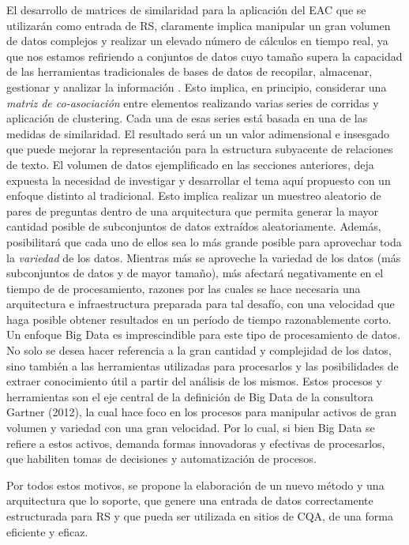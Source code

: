 \bigskip El desarrollo de matrices de similaridad para la aplicación del EAC que se utilizarán como entrada de RS, claramente implica manipular un gran volumen de datos complejos y realizar un elevado número de cálculos en tiempo real, ya que nos estamos refiriendo a conjuntos de datos cuyo tamaño supera la capacidad de las herramientas tradicionales de bases de datos de recopilar, almacenar, gestionar y analizar la información \citep{de2016mineria}. Esto implica, en principio, considerar una \textit{matriz de co-asociación} entre elementos realizando varias series de corridas y aplicación de clustering. Cada una de esas series está basada en una de las medidas de similaridad. El resultado será un un valor adimensional e insesgado que puede mejorar la representación para la estructura subyacente de relaciones de texto. El volumen de datos ejemplificado en las secciones anteriores, deja expuesta la necesidad de investigar y desarrollar el tema aquí propuesto con un enfoque distinto al tradicional. Esto implica realizar un muestreo aleatorio de pares de preguntas dentro de una arquitectura que permita generar la mayor cantidad posible de subconjuntos de datos extraídos aleatoriamente. Además, posibilitará que cada uno de ellos sea lo más grande posible para aprovechar toda la \textit{variedad} de los datos. Mientras más se aproveche la variedad de los datos (más subconjuntos de datos y de mayor tamaño), más afectará negativamente en el tiempo de de procesamiento, razones por las cuales se hace necesaria una arquitectura e infraestructura preparada para tal desafío, con una velocidad que haga posible obtener resultados en un período de tiempo razonablemente corto. Un enfoque Big Data es imprescindible  para este tipo de procesamiento de datos. No solo se desea hacer referencia a la gran cantidad y complejidad de los datos, sino también a las herramientas utilizadas para procesarlos y las posibilidades de extraer conocimiento útil a partir del análisis de los mismos. Estos procesos y herramientas son el eje central de la definición de Big Data de la consultora Gartner (2012), la cual hace foco en los procesos para manipular activos de gran volumen y variedad con una gran velocidad. Por lo cual, si bien Big Data se refiere a estos activos, demanda formas innovadoras y efectivas de procesarlos, que habiliten tomas de decisiones y automatización de procesos.

\bigskip Por todos estos motivos, se propone la elaboración de un nuevo método y una arquitectura que lo soporte, que genere una entrada de datos correctamente estructurada para RS y que pueda ser utilizada en sitios de CQA, de una forma eficiente y eficaz.

